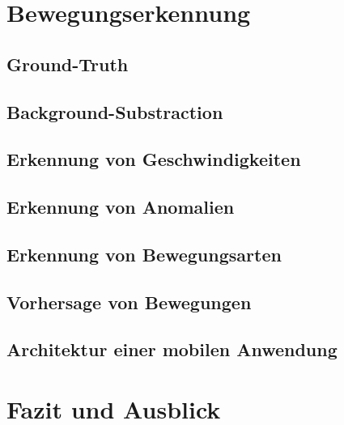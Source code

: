\documentclass{hsflensburg}
\begin{document}
  \chapter{Bewegungserkennung}
  \section{Ground-Truth}
  \section{Background-Substraction}
  \section{Erkennung von Geschwindigkeiten}
  \section{Erkennung von Anomalien}
  \section{Erkennung von Bewegungsarten}
  \section{Vorhersage von Bewegungen}
  \section{Architektur einer mobilen Anwendung}

  \chapter{Fazit und Ausblick}

  \printbibliography
\end{document}
